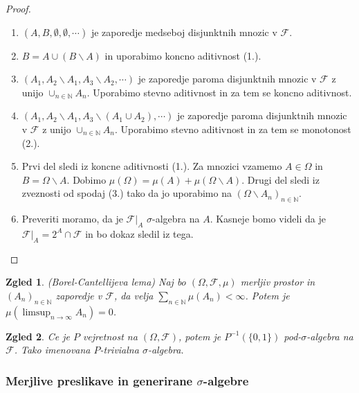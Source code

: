\documentclass[a4paper,12pt]{article}
\newtheorem{zgled}{Zgled}
\newcommand{\N}{\mathbb{N}}
\newcommand{\F}{\mathcal{F}}
\begin{document}
            \begin{proof}
                \begin{enumerate}
                    \item $\left(A, B, \emptyset, \emptyset, \cdots \right)$ je zaporedje medseboj disjunktnih mnozic v $\F$.
                    \item $B = A \cup (B \backslash A)$ in uporabimo koncno aditivnost (1.).
                    \item $\left(A_1, A_2\backslash A_1, A_3\backslash A_2, \cdots \right)$ je zaporedje paroma disjunktnih mnozic v $\F$ z unijo $\cup_{n \in \N}A_n$. Uporabimo stevno aditivnost in za tem se koncno aditivnost.
                    \item $\left(A_1, A_2\backslash A_1, A_3\backslash (A_1 \cup A_2), \cdots \right)$ je zaporedje paroma disjunktnih mnozic v $\F$ z unijo $\cup_{n \in \N}A_n$. Uporabimo stevno aditivnost in za tem se monotonost (2.).
                    \item Prvi del sledi iz koncne aditivnosti (1.). Za mnozici vzamemo $A \in \Omega$ in  $B = \Omega \backslash A$. Dobimo $\mu(\Omega) = \mu(A) + \mu(\Omega \backslash A)$. Drugi del sledi iz zveznosti od spodaj (3.) tako da jo uporabimo na $\left(\Omega\backslash A_n \right)_{n \in \N}$.
                    \item Preveriti moramo, da je $\F|_A$ $\sigma$-algebra na $A$. Kasneje bomo videli da je $\F|_A = 2^A \cap \F$ in bo dokaz sledil iz tega.
                \end{enumerate}
            \end{proof}

            \begin{zgled}(Borel-Cantellijeva lema)
                Naj bo $\left( \Omega, \F, \mu \right)$ merljiv prostor in $(A_n)_{n \in \N}$ zaporedje v $\F$, da velja $\sum_{n \in \N}\mu(A_n) < \infty$. Potem je $\mu(\limsup_{n \rightarrow \infty}A_n) = 0$.
            \end{zgled}
            \begin{zgled}
                Ce je $P$ vejretnost na $\left( \Omega, \F \right)$, potem je $P^{-1}(\{0, 1\})$ pod-$\sigma$-algebra na $\F$. Tako imenovana $P$-trivialna $\sigma$-algebra.
            \end{zgled}

        \subsubsection{Merjlive preslikave in generirane $\sigma$-algebre}
            
\end{document}
